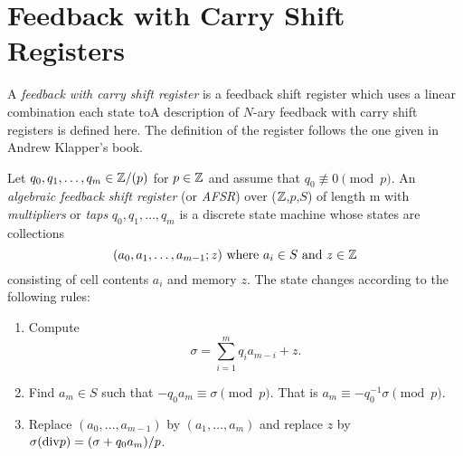 \section{Feedback with Carry Shift Registers}

\par A {\em feedback with carry shift register} is a feedback shift register
which uses a linear combination each state toA description of $N$-ary feedback with
carry shift registers is defined here. The definition of the register follows the
one given in Andrew Klapper's book.

\begin{definition}\label{afsr}
  Let $q_0,q_1,\dots,q_m\in\mathbb{Z}/(p)$ for $p\in\mathbb{Z}$ and assume that
  $q_0\not\equiv0\pmod p$.
  An {\em algebraic feedback shift register} (or {\em AFSR}) over ($\mathbb{Z}$,$p$,$S$)
  of length m with {\em multipliers} or {\em taps} $q_0,q_1,\dots,q_m$ is a discrete
  state machine whose states are  collections
  \[
	(a_0,a_1,\dots,a_{m-1};z) \ {\rm where} \ a_i\in S \ {\rm and} \ z \in \mathbb{Z}
  \]
  consisting of cell contents $a_i$ and memory $z$. The state changes according to
  the following rules:
  \begin{enumerate}[1.]
    \item Compute
      \[
      \sigma = \sum^m_{i=1}q_ia_{m-i}+z.
      \]
    \item Find $a_m\in S$ such that $-q_0a_m\equiv\sigma\pmod p$. That is
      $a_m\equiv-q_{0}^{-1}\sigma\pmod p$.
    \item Replace $(a_0,\dots,a_{m-1})$ by $(a_1,\dots,a_m)$ and replace $z$ by
      $\sigma({\rm div} p) = (\sigma+q_0a_m)/p$.
  \end{enumerate}
\end{definition}
